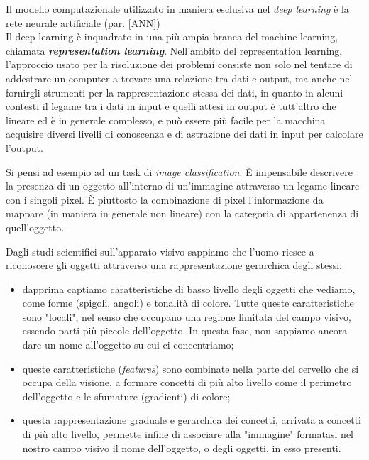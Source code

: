 Il modello computazionale utilizzato in maniera esclusiva nel \textit{deep learning} è la rete neurale artificiale (par. \ref{ANN})\\

Il deep learning è inquadrato in una più ampia branca del machine learning, chiamata \textbf{\textit{representation learning}}. Nell'ambito del representation learning, l'approccio usato per la risoluzione dei problemi consiste non solo nel tentare di addestrare un computer a trovare una relazione tra dati e output, ma anche nel fornirgli strumenti per la rappresentazione stessa dei dati, in quanto in alcuni contesti il legame tra i dati in input e quelli attesi in output è tutt'altro che lineare ed è in generale complesso, e può essere più facile per la macchina acquisire diversi livelli di conoscenza e di astrazione dei dati in input per calcolare l'output.

Si pensi ad esempio ad un task di \textit{image classification}. È impensabile descrivere la presenza di un oggetto all’interno di un'immagine attraverso un legame lineare con i singoli pixel. È piuttosto la combinazione di pixel l'informazione da mappare (in maniera in generale non lineare) con la categoria di appartenenza di quell'oggetto.

Dagli studi scientifici sull'apparato visivo sappiamo che l'uomo riesce a riconoscere gli oggetti attraverso una rappresentazione gerarchica degli stessi:

\begin{itemize}
\item dapprima captiamo caratteristiche di basso livello degli oggetti che vediamo, come forme (spigoli, angoli) e tonalità di colore. Tutte queste caratteristiche sono "locali", nel senso che occupano una regione limitata del campo visivo, essendo parti più piccole dell'oggetto. In questa fase, non sappiamo ancora dare un nome all'oggetto su cui ci concentriamo;
\item queste caratteristiche (\textit{features}) sono combinate nella parte del cervello che si occupa della visione, a formare concetti di più alto livello come il perimetro dell'oggetto e le sfumature (gradienti) di colore;
\item questa rappresentazione graduale e gerarchica dei concetti, arrivata a concetti di più alto livello, permette infine di associare alla "immagine" formatasi nel nostro campo visivo il nome dell'oggetto, o degli oggetti, in esso presenti.
\end{itemize}

